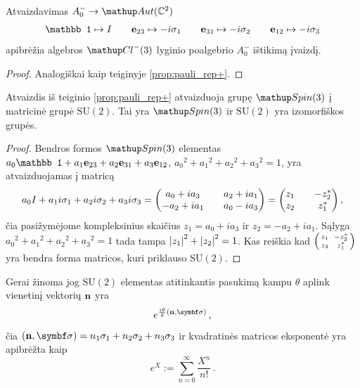 \begin{proposition}
	\label{prop:pauli_rep-}
	Atvaizdavimas $A_0^- \to \mathup Aut (\set C^2)$
	\begin{align*}
		\mathbb 1	\mapsto	I		\qquad
		\vb e_{23} 	\mapsto	-i\sigma_1	\qquad
		\vb e_{31}	\mapsto	-i\sigma_2	\qquad
		\vb e_{12}	\mapsto	-i\sigma_3	
	\end{align*}
	apibrėžia algebros $\Clm$ lyginio poalgebrio $A_0^-$ ištikimą įvaizdį.
\end{proposition}
\begin{proof}
	Analogiškai kaip teiginyje \ref{prop:pauli_rep+}.
\end{proof}

\begin{proposition} 
	Atvaizdis iš teiginio \ref{prop:pauli_rep+} atvaizduoja grupę $\spin$
	į matricinė grupė $\mathup{SU}(2)$.
	Tai yra $\spin$ ir $\mathup{SU}(2)$ yra izomorfiškos grupės.
\end{proposition}
\begin{proof}
	Bendros formos $\spin$ elementas
	$ a_0 \mathbb1 + a_1 \vb e_{23} + a_2 \vb e_{31} + a_3 \vb e_{12}$,
	$ {a_0}^2 +{a_1}^2 +{a_2}^2 +{a_3}^2 = 1 $,
	yra atvaizduojamas į matricą
	\begin{equation}
		a_0 I + a_1 i\sigma_1 + a_2 i\sigma_2 + a_3 i\sigma_3
		=
		\mqty(
			  a_0 + ia_3	&& a_2 + ia_1 \\
			- a_2 + ia_1	&& a_0 - ia_3 
		)
		=
		\mqty(
			z_1	&& -z_2^* \\
			z_2	&& z_1^* 
		)
		\,,
	\end{equation}
	čia pasižymėjome kompleksinius skaičius 
	$z_1 = a_0 + i a_3$ ir $z_2 = - a_2 + ia_1$. 
	Sąlyga $ {a_0}^2 +{a_1}^2 +{a_2}^2 +{a_3}^2 = 1 $
	tada tampa $ \abs{z_1}^2 + \abs{z_2}^2 = 1$.
	Kas reiškia kad $
		\smqty(
			z_1	&& -z_2^* \\
			z_2	&& z_1^* 
		)
	$ yra bendra forma matricos, kuri priklauso $\mathup{SU}(2)$.
\end{proof}

Gerai žinoma jog $\mathup{SU}(2)$ elementas atitinkantis pasukimą
kampu $\theta$ aplink vienetinį vektorių $\vb n$ yra
\begin{equation}
	e^{\frac{i\theta}{2} (\vb n,\symbf\sigma)}
	\,,
\end{equation}
čia $(\vb n,\symbf\sigma) = n_1 \sigma_1 + n_2 \sigma_2 + n_3 \sigma_3 $
ir kvadratinės matricos eksponentė yra apibrėžta kaip 
\begin{equation}
	e^X := \sum_{n=0}^\infty \frac{X^n}{n!}
	\,.
\end{equation}

